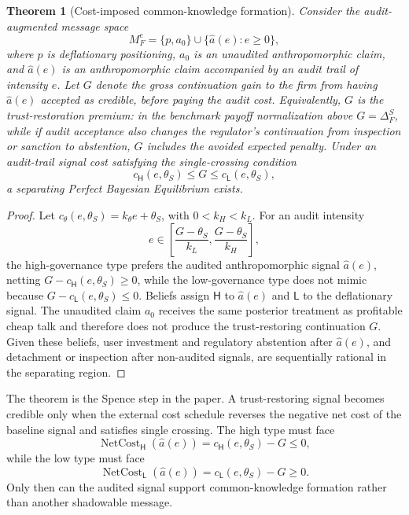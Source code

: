 \documentclass[review,authoryear]{elsarticle}
\newtheorem{theorem}{Theorem}
\theoremstyle{definition}
\theoremstyle{plain}
\begin{document}
\begin{theorem}[Cost-imposed common-knowledge formation]
\label{thm:audit-cost-separation}
\label{thm:separation}
Consider the audit-augmented message space
\[
M_F^e=\{p,a_0\}\cup\{\widehat a(e):e\geq0\},
\]
where $p$ is deflationary positioning, $a_0$ is an unaudited anthropomorphic
claim, and $\widehat a(e)$ is an anthropomorphic claim accompanied by an audit
trail of intensity $e$.  Let $G$ denote the gross continuation gain to the firm
from having $\widehat a(e)$ accepted as credible, before paying the audit cost.
Equivalently, $G$ is the trust-restoration premium: in the benchmark payoff
normalization above $G=\Delta_F^S$, while if audit acceptance also changes the
regulator's continuation from inspection or sanction to abstention, $G$ includes
the avoided expected penalty.  Under an audit-trail signal cost satisfying the
single-crossing condition
\[
c_\mathsf{H}(e,\theta_S)\leq G\leq c_\mathsf{L}(e,\theta_S),
\]
a separating Perfect Bayesian Equilibrium exists.
\end{theorem}
\begin{proof}
Let $c_\theta(e,\theta_S)=k_\theta e+\theta_S$, with $0<k_H<k_L$.  For an audit intensity
\[
e\in\left[\frac{G-\theta_S}{k_L},\frac{G-\theta_S}{k_H}\right],
\]
the high-governance type prefers the audited anthropomorphic signal
$\widehat a(e)$, netting $G-c_\mathsf{H}(e,\theta_S)\geq0$, while the
low-governance type does not mimic because
$G-c_\mathsf{L}(e,\theta_S)\leq0$.  Beliefs assign $\mathsf{H}$ to
$\widehat a(e)$ and $\mathsf{L}$ to the deflationary signal.  The unaudited
claim $a_0$ receives the same posterior treatment as profitable cheap talk and therefore
does not produce the trust-restoring continuation $G$.  Given these beliefs,
user investment and regulatory abstention after $\widehat a(e)$, and detachment
or inspection after non-audited signals, are sequentially rational in the
separating region.
\end{proof}

The theorem is the Spence step in the paper.  A trust-restoring signal becomes credible only when the external cost schedule reverses the negative net cost of the baseline signal and satisfies single crossing.  The high type must face
\[
\operatorname{NetCost}_{\mathsf{H}}(\widehat a(e))
=
c_\mathsf{H}(e,\theta_S)-G
\leq0,
\]
while the low type must face
\[
\operatorname{NetCost}_{\mathsf{L}}(\widehat a(e))
=
c_\mathsf{L}(e,\theta_S)-G
\geq0.
\]
Only then can the audited signal support common-knowledge formation rather than another shadowable message.
\end{document}
